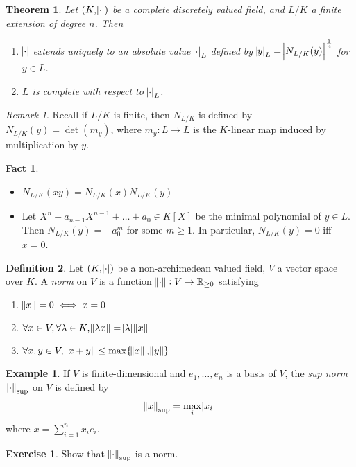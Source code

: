 \documentclass[11pt]{article}
\theoremstyle{definition}
\newtheorem{definition}{Definition}[subsection]
\newtheorem*{example}{Example}
\newtheorem*{exercise}{Exercise}
\newtheorem*{fact}{Fact}
\theoremstyle{plain}
\newtheorem{theorem}[definition]{Theorem}
\theoremstyle{remark}
\newtheorem*{remark}{Remark}
\newcommand{\bR}{\mathbb{R}}
\begin{document}
\begin{theorem}\label{thm:6_1}
    Let $(K, \abs{\cdot})$ be a complete discretely valued field, and $L / K$ a finite extension of degree $n$. Then
    \begin{enumerate}
        \item $\abs{\cdot}$ extends uniquely to an absolute value $\abs{\cdot}_L$ defined by $\abs{y}_L = \abs{N_{L/K}(y)}^\frac{1}{n}$ for $y \in L$.
        \item $L$ is complete with respect to $\abs{\cdot}_L$.
    \end{enumerate}
\end{theorem}

\begin{remark}
    Recall if $L / K$ is finite, then $N_{L/K}$ is defined by $N_{L/K}(y) = \det (m_y)$, where $m_y : L \to L$ is the $K$-linear map induced by multiplication by $y$.
\end{remark}

\begin{fact}\phantom{}
    \begin{itemize}
        \item $N_{L/K}(xy) = N_{L/K}(x) N_{L/K}(y)$
        \item Let $X^n + a_{n-1}X^{n-1} + \ldots + a_0 \in K[X]$ be the minimal polynomial of $y \in L$. Then $N_{L/K}(y) = \pm a_0^m$ for some $m \ge 1$. In particular, $N_{L/K}(y) = 0$ iff $x = 0$.
    \end{itemize}
\end{fact}

\begin{definition}
    Let $(K, \abs{\cdot})$ be a non-archimedean valued field, $V$ a vector space over $K$. A \emph{norm} on $V$ is a function $\norm{\cdot} : V \to \bR_{\ge 0}$ satisfying
    \begin{enumerate}
        \item $\norm{x} = 0 \iff x = 0$
        \item $\forall x \in V, \forall \lambda \in K, \norm{\lambda x} = \abs{\lambda} \norm{x}$
        \item $\forall x, y \in V, \norm{x + y} \le \max\{\norm{x}, \norm{y}\}$
    \end{enumerate}
\end{definition}

\begin{example}
    If $V$ is finite-dimensional and $e_1, \ldots, e_n$ is a basis of $V$, the \emph{sup norm} $\norm{\cdot}_\mathrm{sup}$ on $V$ is defined by
    \begin{equation*}
        \norm{x}_\mathrm{sup} = \max_i \abs{x_i}
    \end{equation*}
    where $x = \sum_{i=1}^n x_i e_i$.
\end{example}
\begin{exercise}
    Show that $\norm{\cdot}_\mathrm{sup}$ is a norm.
\end{exercise}
\end{document}
